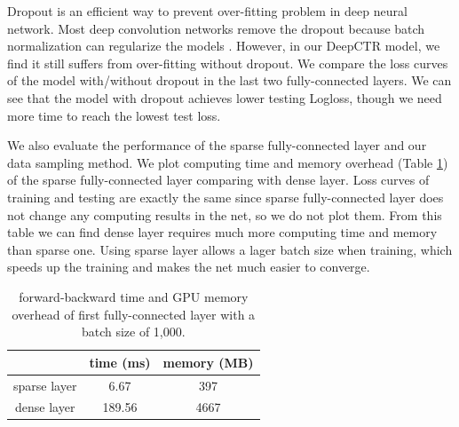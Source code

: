 \documentclass{sig-alternate}
\begin{document}
Dropout \cite{srivastava2014dropout} is an efficient way to prevent over-fitting problem in deep neural network. Most deep convolution networks remove the dropout because batch normalization can regularize the models \cite{he2015deep, ioffe2015batch}. However, in our DeepCTR model, we find it still suffers from over-fitting without dropout. We compare the loss curves of the model with/without dropout in the last two fully-connected layers. We can see that the model with dropout achieves lower testing Logloss, though we need more time to reach the lowest test loss.


We also evaluate the performance of the sparse fully-connected layer and our data sampling method. We plot computing time and memory overhead (Table \ref{table:time&memory}) of the sparse fully-connected layer comparing with dense layer. Loss curves of training and testing are exactly the same since sparse fully-connected layer does not change any computing results in the net, so we do not plot them. From this table we can find dense layer  requires much more computing time and memory than sparse one. Using sparse layer allows a lager batch size when training, which speeds up the training and makes the net much easier to converge. 

\begin{table}
	\centering
	\caption{forward-backward time and GPU memory overhead of first fully-connected layer with a batch size of 1,000.}
	\label{table:time&memory}
	\begin{tabular}{|c|c|c|} \hline
		& time (ms) & memory (MB)\\ \hline
		sparse layer & 6.67 &397 \\ \hline
		dense layer & 189.56 &4667 \\ \hline
	\end{tabular}
\end{table}
\end{document}
